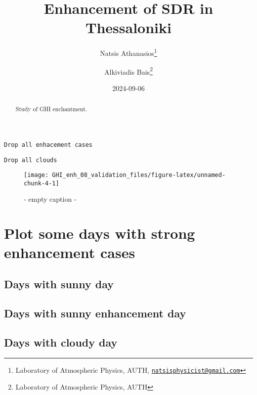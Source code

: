 \documentclass[
  10pt,
  a4paper,oneside]{article}
\title{Enhancement of SDR in Thessaloniki}
\author{Natsis Athanasios\footnote{Laboratory of Atmospheric Physics, AUTH, \href{mailto:natsisphysicist@gmail.com}{\nolinkurl{natsisphysicist@gmail.com}}} \and Alkiviadis Bais\footnote{Laboratory of Atmospheric Physics, AUTH}}
\date{2024-09-06}
\begin{document}
\maketitle
\begin{abstract}
Study of GHI enchantment.
\end{abstract}

{
\hypersetup{linkcolor=}
\setcounter{tocdepth}{4}
\tableofcontents
}
\begin{verbatim}
Drop all enhacement cases
\end{verbatim}

\begin{verbatim}
Drop all clouds
\end{verbatim}

\begin{figure}[H]

{\centering \texttt{[image: GHI\_enh\_08\_validation\_files/figure-latex/unnamed-chunk-4-1]} 

}

\caption{ - empty caption - }\label{fig:unnamed-chunk-4}
\end{figure}

\FloatBarrier

\section{Plot some days with strong enhancement cases}\label{plot-some-days-with-strong-enhancement-cases}

\FloatBarrier

\subsection{Days with sunny day}\label{days-with-sunny-day}

\FloatBarrier

\subsection{Days with sunny enhancement day}\label{days-with-sunny-enhancement-day}

\FloatBarrier

\subsection{Days with cloudy day}\label{days-with-cloudy-day}

\FloatBarrier
\end{document}
